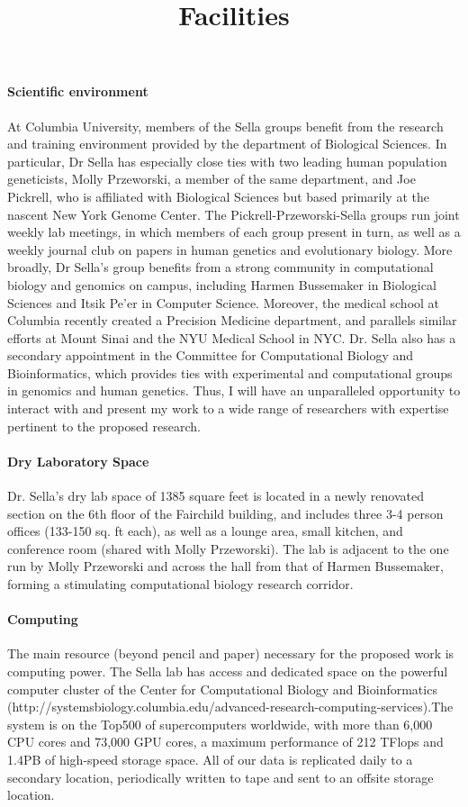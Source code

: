 \documentclass[11pt]{article}
\title{Facilities}
\date{}
\begin{document}
\maketitle

\paragraph{Scientific environment}

At Columbia University, members of the Sella groups benefit from the research and training environment provided by the department of Biological Sciences. In particular, Dr Sella has especially close ties with two leading human population geneticists, Molly Przeworski, a member of the same department, and Joe Pickrell, who is affiliated with Biological Sciences but based primarily at the nascent New York Genome Center. The Pickrell-Przeworski-Sella groups run joint weekly lab meetings, in which members of each group present in turn, as well as a weekly journal club on papers in human genetics and evolutionary biology. More broadly, Dr Sella's group benefits from a strong community in computational biology and genomics on campus, including Harmen Bussemaker in Biological Sciences and Itsik Pe’er in Computer Science. Moreover, the medical school at Columbia recently created a Precision Medicine department, and parallels similar efforts at Mount Sinai and the NYU Medical School in NYC. Dr. Sella also has a secondary appointment in the Committee for Computational Biology and Bioinformatics, which provides ties with experimental and computational groups in genomics and human genetics. Thus, I will have an unparalleled opportunity to interact with and present my work to a wide range of researchers with expertise pertinent to the proposed research.

\paragraph{Dry Laboratory Space}
Dr. Sella’s dry lab space of 1385 square feet is located in a newly renovated section on the 6th floor of the Fairchild building, and includes three 3-4 person offices (133-150 sq. ft each), as well as a lounge area, small kitchen, and conference room (shared with Molly Przeworski). The lab is adjacent to the one run by Molly Przeworski and across the hall from that of Harmen Bussemaker, forming a stimulating computational biology research corridor.

\paragraph{Computing}
The main resource (beyond pencil and paper) necessary for the proposed work is computing power. The Sella lab has access and dedicated space on the powerful computer cluster of the Center for Computational Biology and Bioinformatics (http://systemsbiology.columbia.edu/advanced-research-computing-services).The system is on the Top500 of supercomputers worldwide, with more than 6,000 CPU cores and 73,000 GPU cores, a maximum performance of 212 TFlops and 1.4PB of high-speed storage space. All of our data is replicated daily to a secondary location, periodically written to tape and sent to an offsite storage location.
\end{document}
